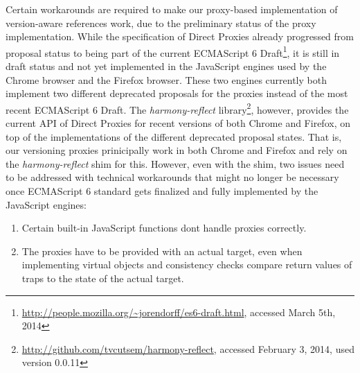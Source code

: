 Certain workarounds are required to make our proxy-based implementation of version-aware references work, due to the preliminary status of the proxy implementation.
While the specification of Direct Proxies already progressed from proposal status to being part of the current ECMAScript 6 Draft\footnote{\url{http://people.mozilla.org/~jorendorff/es6-draft.html}, accessed March 5th, 2014}, it is still in draft status and not yet implemented in the JavaScript engines used by the Chrome browser and the Firefox browser.
These two engines currently both implement two different deprecated proposals for the proxies instead of the most recent ECMAScript 6 Draft.
The \emph{harmony-reflect} library\footnote{\url{http://github.com/tvcutsem/harmony-reflect}, accessed February 3, 2014, used version 0.0.11}, however, provides the current API of Direct Proxies for recent versions of both Chrome and Firefox, on top of the implementations of the different deprecated proposal states.
That is, our versioning proxies prinicipally work in both Chrome and Firefox and rely on the \emph{harmony-reflect} shim for this.
However, even with the shim, two issues need to be addressed with technical workarounds that might no longer be necessary once ECMAScript 6 standard gets finalized and fully implemented by the JavaScript engines: 

\begin{enumerate}
    \item Certain built-in JavaScript functions dont handle proxies correctly.
    \item The proxies have to be provided with an actual target, even when implementing virtual objects and consistency checks compare return values of traps to the state of the actual target. 
\end{enumerate}

